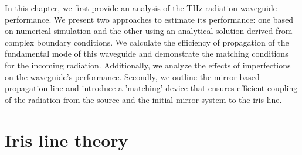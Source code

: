     In this chapter, we first provide an analysis of the THz radiation waveguide performance. We present two approaches to estimate its performance: one based on numerical simulation and the other using an analytical solution derived from complex boundary conditions. We calculate the efficiency of propagation of the fundamental mode of this waveguide and demonstrate the matching conditions for the incoming radiation. Additionally, we analyze the effects of imperfections on the waveguide's performance. Secondly, we outline the mirror-based propagation line and introduce a 'matching' device that ensures efficient coupling of the radiation from the source and the initial mirror system to the iris line.
    

\section{Iris line theory}

